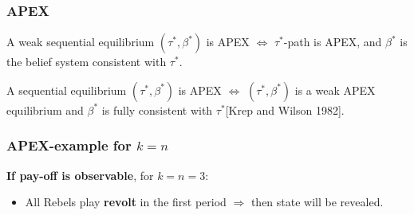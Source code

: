 \documentclass[9pt]{beamer}
\begin{document}
\begin{frame}
  \frametitle{APEX}


\begin{definition}
A weak sequential equilibrium $(\tau^{*},\beta^{*})$ is APEX $\Leftrightarrow$ $\tau^{*}$-path is APEX, and $\beta^{*}$ is the belief system consistent with $\tau^{*}$.
\end{definition}
\pause
\begin{definition}
A sequential equilibrium $(\tau^{*},\beta^{*})$ is APEX $\Leftrightarrow$ $(\tau^{*},\beta^{*})$ is a weak APEX equilibrium and $\beta^{*}$ is fully consistent with $\tau^{*}$[Krep and Wilson 1982].
\end{definition}

\end{frame}






\begin{frame}
  \frametitle{APEX-example for $k=n$}

\alert{\textbf{If pay-off is observable}}, for $k=n=3$:
  \begin{center}
\end{center}

\begin{itemize}[<+->]
\item All Rebels play \textbf{revolt} in the first period $\Rightarrow$ then state will be revealed.
\end{itemize}

  
\end{frame}
\end{document}
